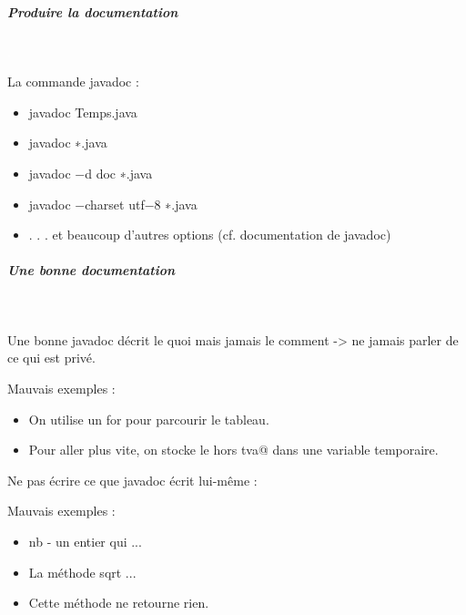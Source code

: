 \documentclass[11pt,a4paper]{article}
\begin{document}
            \par
        
			
		\subparagraph{Produire la documentation} 
		
					\textcolor{white}{.} \par
				
        La commande javadoc : 
        
					\begin{itemize}
				
			\item javadoc Temps.java
			\item javadoc ∗.java
			\item javadoc −d doc ∗.java
			\item javadoc −charset utf−8 ∗.java
			\item . . . et beaucoup d'autres options (cf. documentation de javadoc)
					\end{itemize}
				
            \par
        
			
		\subparagraph{Une bonne documentation} 
		
					\textcolor{white}{.} \par
				
        Une bonne javadoc d\'ecrit le quoi mais jamais le comment -> ne jamais parler de ce qui est priv\'e.
      
            \par
        
        Mauvais exemples :
        
					\begin{itemize}
				
			\item On utilise un for pour parcourir le tableau.
			\item Pour aller plus vite, on stocke le \verb@prix hors tva@ dans une variable temporaire.
					\end{itemize}
				
            \par
        
        Ne pas \'ecrire ce que javadoc \'ecrit lui-m\^eme :
      
            \par
        
        Mauvais exemples :
        
					\begin{itemize}
				
			\item nb - un entier qui ...
			\item La m\'ethode sqrt ...
			\item Cette m\'ethode ne retourne rien.
					\end{itemize}
				
\end{document}
